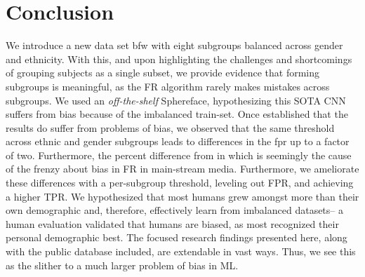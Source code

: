 \documentclass[10pt,twocolumn,letterpaper]{article}
\begin{document}
\glsresetall
\section{Conclusion}
We introduce a new data set \gls{bfw} with eight subgroups balanced across gender and ethnicity. With this, and upon highlighting the challenges and shortcomings of grouping subjects as a single subset, we provide evidence that forming subgroups is meaningful, as the FR algorithm rarely makes mistakes across subgroups. We used an \textit{off-the-shelf} Sphereface, hypothesizing this SOTA CNN suffers from bias because of the imbalanced train-set. Once established that the results do suffer from problems of bias, we observed that the same threshold across ethnic and gender subgroups leads to differences in the \gls{fpr} up to a factor of two. Furthermore, the percent difference from in which is seemingly the cause of the frenzy about bias in FR in main-stream media. Furthermore, we ameliorate these differences with a per-subgroup threshold, leveling out FPR, and achieving a higher TPR. We hypothesized that most humans grew amongst more than their own demographic and, therefore, effectively learn from imbalanced datasets-- a human evaluation validated that humans are biased, as most recognized their personal demographic best. The focused research findings presented here, along with the public database included, are extendable in vast ways. Thus, we see this as the slither to a much larger problem of bias in ML.



{\small


}

% 
\end{document}
